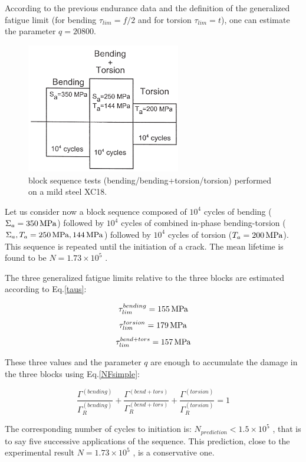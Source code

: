 According to the previous endurance data and the
definition of the generalized fatigue limit (for bending
$\tau_{lim} =f/2$ and for torsion $\tau_{lim}=t$), one can estimate the parameter $q=20 800$.

\begin{figure}[h!]
	\centering
	\includegraphics[width=0.6\textwidth]{figures//block.png} 
	\caption{block sequence tests (bending/bending+torsion/torsion) performed on a mild
		steel XC18.}
	\label{block}
\end{figure} 

Let us consider now a block sequence composed of
$10^4$ cycles of bending ($\Sigma_a =350\,\textnormal{MPa}$) followed by $10^4$
cycles of combined in-phase bending-torsion ($\Sigma_a ,T_a =250 \,\textnormal{MPa}, 144 \,\textnormal{MPa}$)
followed by $10^4$ cycles of torsion ($T_a =200\,\textnormal{MPa}$). This
sequence is repeated until the initiation of a crack. The
mean lifetime is found to be $N=1.73\times10^5$ .

The three generalized fatigue
limits relative to the three blocks are estimated according
to Eq.\eqref{taus}:

$$\tau_{lim}^{bending}=155 \,\textnormal{MPa}$$    
$$\tau_{lim}^{torsion}=179 \,\textnormal{MPa}$$  
$$\tau_{lim}^{bend+tors}=157 \,\textnormal{MPa}$$


These three values and the parameter $q$ are enough to
accumulate the damage in the three blocks using Eq.\eqref{NFsimple}:


$$\frac{\Gamma^{(bending)}}{\Gamma_R^{(bending)}}+\frac{\Gamma^{(bend+tors)}}{\Gamma_R^{(bend+tors)}}+\frac{\Gamma^{(torsion)}}{\Gamma_R^{(torsion)}}=1$$

The corresponding number of cycles to initiation is:
$N_{prediction} <1.5\times10^5$ , that is to say five successive applications of the sequence. This prediction, close to the experimental result $N=1.73\times10^5$ , is a conservative one.

